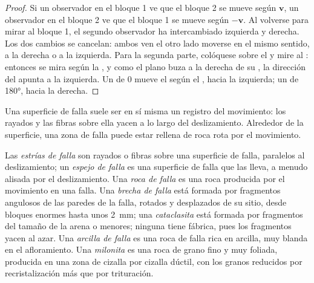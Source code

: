 \begin{proof}
Si un observador en el bloque 1 ve que el bloque 2 se mueve según $\mathbf v$, un observador en el bloque 2 ve que el bloque 1
se mueve según $-\mathbf v$. Al volverse para mirar al bloque 1, el segundo observador ha intercambiado izquierda y derecha.
Los dos cambios se cancelan: ambos ven el otro lado moverse en el mismo sentido, a la derecha o a la izquierda. Para la
segunda parte, colóquese sobre el  y mire al : entonces se mira según la , y como el plano buza a la derecha de su , la dirección del  apunta a la izquierda. Un  de $0$
mueve el  según el , hacia la izquierda; un  de \ang{180}, hacia la derecha.
\end{proof}

Una superficie de falla suele ser en sí misma un registro del movimiento: los rayados y las fibras sobre ella yacen a lo largo
del deslizamiento. Alrededor de la superficie, una zona de falla puede estar rellena de roca rota por el movimiento.

\begin{definition}\label{def:b1:faults-folds-fabrics:fault-rocks}
Las \emph{estrías de falla} son rayados o fibras sobre una superficie de falla, paralelos al
deslizamiento; un \emph{espejo de falla} es una superficie de falla que las lleva, a menudo alisada por
el deslizamiento. Una \emph{roca de falla} es una roca producida por el movimiento en una falla. Una
\emph{brecha de falla} está formada por fragmentos angulosos de las paredes de la falla, rotados y
desplazados de su sitio, desde bloques enormes hasta unos \qty{2}{mm}; una \emph{cataclasita} está formada
por fragmentos del tamaño de la arena o menores; ninguna tiene fábrica, pues los fragmentos yacen al azar. Una
\emph{arcilla de falla} es una roca de falla rica en arcilla, muy blanda en el afloramiento. Una
\emph{milonita} es una roca de grano fino y muy foliada, producida en una zona de cizalla por cizalla dúctil,
con los granos reducidos por recristalización más que por trituración.
\end{definition}

